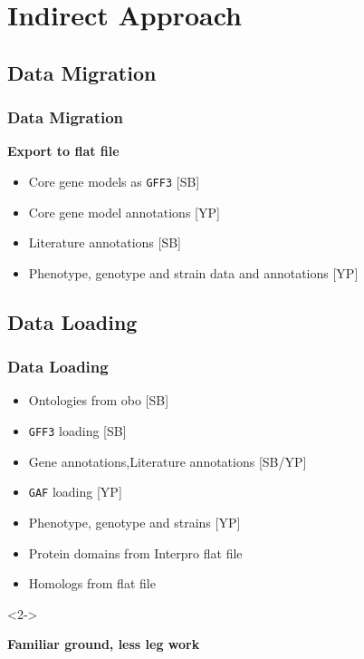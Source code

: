 \documentclass[hyperref={pdfpagelabels=false}, compress]{beamer}
\begin{document}
\section{Indirect Approach}

\subsection{Data Migration}
\begin{frame}
    \frametitle{Data Migration} 
	\textbf{\Large Export to flat file}
	\begin{itemize}
		\item Core gene models as \texttt{GFF3} [SB]
		\item Core gene model annotations [YP]
		\item Literature annotations [SB]
		\item Phenotype, genotype and strain data and annotations [YP]
	\end{itemize}
        
\end{frame}

\subsection{Data Loading}
\begin{frame}
  	\frametitle{Data Loading}
  	\begin{itemize}
		\item Ontologies from obo [SB]
       	\item \texttt{GFF3} loading [SB]
       	\item Gene annotations,Literature annotations [SB/YP]
       	\item \texttt{GAF} loading [YP]
       	\item Phenotype, genotype and strains [YP]
       	\item {\color{dark-gray} Protein domains from Interpro flat file}
       	\item {\color{dark-gray} Homologs from flat file}
  	\end{itemize}
  	
	\begin{block}{}<2->
  		\begin{center}
  			\textbf{\Large Familiar ground, less leg work}
		\end{center}
	\end{block}
	
\end{frame}
\end{document}
